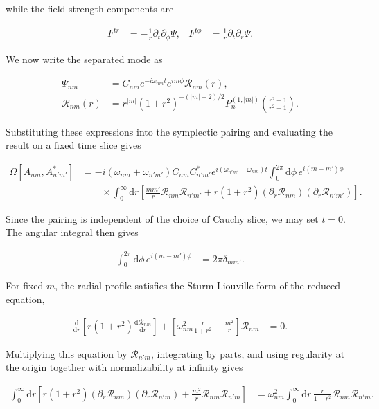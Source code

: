 while the field-strength components are

\begin{align}
F^{tr}&=-\frac{1}{r}\partial_{t}\partial_{\phi}\Psi, &
F^{t\phi}&=\frac{1}{r}\partial_{t}\partial_{r}\Psi.
\end{align}

We now write the separated mode as

\begin{align}
\Psi_{nm}&=C_{nm}e^{-i\omega_{nm}t}e^{im\phi}\mathcal{R}_{nm}(r), \\
\mathcal{R}_{nm}(r)&=r^{|m|}(1+r^{2})^{-(|m|+2)/2}P_{n}^{(1,|m|)}\left(\frac{r^{2}-1}{r^{2}+1}\right).
\end{align}

Substituting these expressions into the symplectic pairing and evaluating the result on a fixed time slice gives

\begin{align}
\Omega[A_{nm},A_{n'm'}^{*}]&=-i(\omega_{nm}+\omega_{n'm'})C_{nm}C_{n'm'}^{*}e^{i(\omega_{n'm'}-\omega_{nm})t}\int_{0}^{2\pi}\mathrm{d}\phi\,e^{i(m-m')\phi} \\
&\qquad\times\int_{0}^{\infty}\mathrm{d}r\left[\frac{mm'}{r}\mathcal{R}_{nm}\mathcal{R}_{n'm'}+r(1+r^{2})(\partial_{r}\mathcal{R}_{nm})(\partial_{r}\mathcal{R}_{n'm'})\right].
\end{align}

Since the pairing is independent of the choice of Cauchy slice, we may set $t=0$. The angular integral then gives

\begin{align}
\int_{0}^{2\pi}\mathrm{d}\phi\,e^{i(m-m')\phi}&=2\pi\delta_{mm'}.
\end{align}

For fixed $m$, the radial profile satisfies the Sturm-Liouville form of the reduced equation,

\begin{align}
\frac{\mathrm{d}}{\mathrm{d}r}\left[r(1+r^{2})\frac{\mathrm{d}\mathcal{R}_{nm}}{\mathrm{d}r}\right]+\left[\omega_{nm}^{2}\frac{r}{1+r^{2}}-\frac{m^{2}}{r}\right]\mathcal{R}_{nm}&=0.
\end{align}

Multiplying this equation by $\mathcal{R}_{n'm}$, integrating by parts, and using regularity at the origin together with normalizability at infinity gives

\begin{align}
\int_{0}^{\infty}\mathrm{d}r\left[r(1+r^{2})(\partial_{r}\mathcal{R}_{nm})(\partial_{r}\mathcal{R}_{n'm})+\frac{m^{2}}{r}\mathcal{R}_{nm}\mathcal{R}_{n'm}\right]&=\omega_{nm}^{2}\int_{0}^{\infty}\mathrm{d}r\,\frac{r}{1+r^{2}}\mathcal{R}_{nm}\mathcal{R}_{n'm}.
\end{align}


